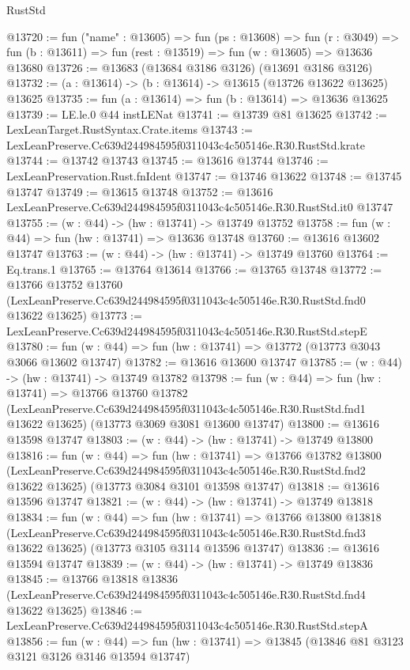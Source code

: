 \begin{lexlean}{RustStd}
\begin{coremodule}
@13720 := fun ("name" : @13605) =>
  fun (ps : @13608) =>
  fun (r : @3049) => fun (b : @13611) => fun (rest : @13519) => fun (w : @13605) => @13636 @13680
@13726 := @13683 (@13684 @3186 @3126) (@13691 @3186 @3126)
@13732 := (a : @13614) -> (b : @13614) -> @13615 (@13726 @13622 @13625) @13625
@13735 := fun (a : @13614) => fun (b : @13614) => @13636 @13625
@13739 := LE.le.{0} @44 instLENat
@13741 := @13739 @81 @13625
@13742 := LexLeanTarget.RustSyntax.Crate.items
@13743 := LexLeanPreserve.Cc639d244984595f0311043c4c505146e.R30.RustStd.krate
@13744 := @13742 @13743
@13745 := @13616 @13744
@13746 := LexLeanPreservation.Rust.fnIdent
@13747 := @13746 @13622
@13748 := @13745 @13747
@13749 := @13615 @13748
@13752 := @13616 LexLeanPreserve.Cc639d244984595f0311043c4c505146e.R30.RustStd.it0 @13747
@13755 := (w : @44) -> (hw : @13741) -> @13749 @13752
@13758 := fun (w : @44) => fun (hw : @13741) => @13636 @13748
@13760 := @13616 @13602 @13747
@13763 := (w : @44) -> (hw : @13741) -> @13749 @13760
@13764 := Eq.trans.{1}
@13765 := @13764 @13614
@13766 := @13765 @13748
@13772 := @13766
    @13752
    @13760
    (LexLeanPreserve.Cc639d244984595f0311043c4c505146e.R30.RustStd.fnd0 @13622 @13625)
@13773 := LexLeanPreserve.Cc639d244984595f0311043c4c505146e.R30.RustStd.stepE
@13780 := fun (w : @44) => fun (hw : @13741) => @13772 (@13773 @3043 @3066 @13602 @13747)
@13782 := @13616 @13600 @13747
@13785 := (w : @44) -> (hw : @13741) -> @13749 @13782
@13798 := fun (w : @44) =>
  fun (hw : @13741) =>
  @13766
    @13760
    @13782
    (LexLeanPreserve.Cc639d244984595f0311043c4c505146e.R30.RustStd.fnd1 @13622 @13625)
    (@13773 @3069 @3081 @13600 @13747)
@13800 := @13616 @13598 @13747
@13803 := (w : @44) -> (hw : @13741) -> @13749 @13800
@13816 := fun (w : @44) =>
  fun (hw : @13741) =>
  @13766
    @13782
    @13800
    (LexLeanPreserve.Cc639d244984595f0311043c4c505146e.R30.RustStd.fnd2 @13622 @13625)
    (@13773 @3084 @3101 @13598 @13747)
@13818 := @13616 @13596 @13747
@13821 := (w : @44) -> (hw : @13741) -> @13749 @13818
@13834 := fun (w : @44) =>
  fun (hw : @13741) =>
  @13766
    @13800
    @13818
    (LexLeanPreserve.Cc639d244984595f0311043c4c505146e.R30.RustStd.fnd3 @13622 @13625)
    (@13773 @3105 @3114 @13596 @13747)
@13836 := @13616 @13594 @13747
@13839 := (w : @44) -> (hw : @13741) -> @13749 @13836
@13845 := @13766
    @13818
    @13836
    (LexLeanPreserve.Cc639d244984595f0311043c4c505146e.R30.RustStd.fnd4 @13622 @13625)
@13846 := LexLeanPreserve.Cc639d244984595f0311043c4c505146e.R30.RustStd.stepA
@13856 := fun (w : @44) =>
  fun (hw : @13741) => @13845 (@13846 @81 @3123 @3121 @3126 @3146 @13594 @13747)

\end{coremodule}
\end{lexlean}
